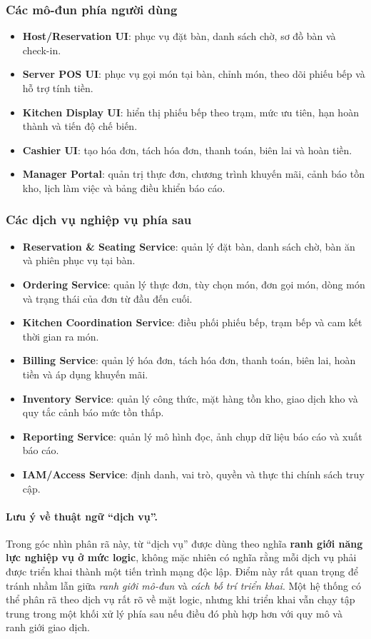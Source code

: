 \documentclass[11pt,a4paper]{article}
\begin{document}
\subsubsection{Các mô-đun phía người dùng}
\begin{itemize}
  \item \textbf{Host/Reservation UI}: phục vụ đặt bàn, danh sách chờ, sơ đồ bàn và check-in.
  \item \textbf{Server POS UI}: phục vụ gọi món tại bàn, chỉnh món, theo dõi phiếu bếp và hỗ trợ tính tiền.
  \item \textbf{Kitchen Display UI}: hiển thị phiếu bếp theo trạm, mức ưu tiên, hạn hoàn thành và tiến độ chế biến.
  \item \textbf{Cashier UI}: tạo hóa đơn, tách hóa đơn, thanh toán, biên lai và hoàn tiền.
  \item \textbf{Manager Portal}: quản trị thực đơn, chương trình khuyến mãi, cảnh báo tồn kho, lịch làm việc và bảng điều khiển báo cáo.
\end{itemize}

\subsubsection{Các dịch vụ nghiệp vụ phía sau}
\begin{itemize}
  \item \textbf{Reservation \& Seating Service}: quản lý đặt bàn, danh sách chờ, bàn ăn và phiên phục vụ tại bàn.
  \item \textbf{Ordering Service}: quản lý thực đơn, tùy chọn món, đơn gọi món, dòng món và trạng thái của đơn từ đầu đến cuối.
  \item \textbf{Kitchen Coordination Service}: điều phối phiếu bếp, trạm bếp và cam kết thời gian ra món.
  \item \textbf{Billing Service}: quản lý hóa đơn, tách hóa đơn, thanh toán, biên lai, hoàn tiền và áp dụng khuyến mãi.
  \item \textbf{Inventory Service}: quản lý công thức, mặt hàng tồn kho, giao dịch kho và quy tắc cảnh báo mức tồn thấp.
  \item \textbf{Reporting Service}: quản lý mô hình đọc, ảnh chụp dữ liệu báo cáo và xuất báo cáo.
  \item \textbf{IAM/Access Service}: định danh, vai trò, quyền và thực thi chính sách truy cập.
\end{itemize}

\paragraph{Lưu ý về thuật ngữ \enquote{dịch vụ}.}
Trong góc nhìn phân rã này, từ \enquote{dịch vụ} được dùng theo nghĩa
\textbf{ranh giới năng lực nghiệp vụ ở mức logic},
không mặc nhiên có nghĩa rằng mỗi dịch vụ phải được triển khai thành một tiến trình mạng độc lập.
Điểm này rất quan trọng để tránh nhầm lẫn giữa \emph{ranh giới mô-đun} và \emph{cách bố trí triển khai}.
Một hệ thống có thể phân rã theo dịch vụ rất rõ về mặt logic,
nhưng khi triển khai vẫn chạy tập trung trong một khối xử lý phía sau nếu điều đó phù hợp hơn với quy mô và ranh giới giao dịch.
\end{document}
